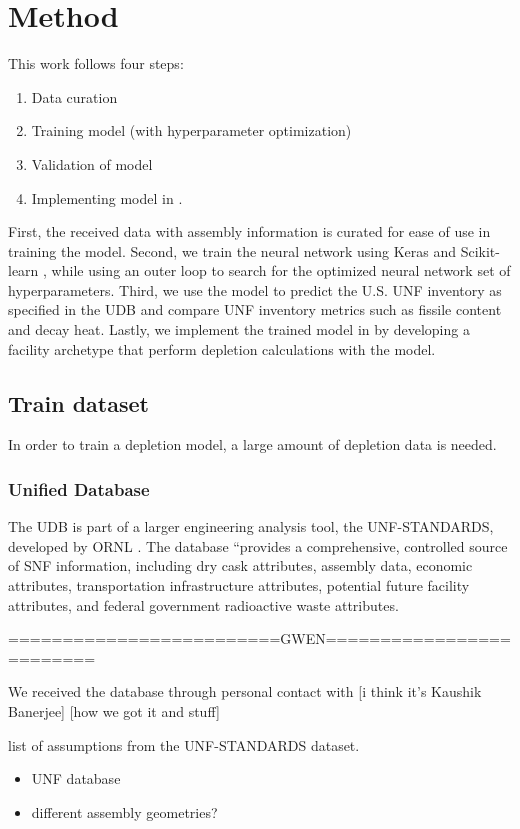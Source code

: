 \section{Method}

This work follows four steps:
\begin{enumerate}
\item Data curation
\item Training model (with hyperparameter optimization)
\item Validation of model
\item Implementing model in \Cyclus.
\end{enumerate}
First, the
received data with assembly information is
curated for ease of use in training the model.
Second, we train the neural network using Keras \cite{collet_keras_2015}
and Scikit-learn \cite{pedregosa_scikit-learn_2011},
while using an outer loop to
search for the optimized neural network set of hyperparameters.
Third, we use the model to predict the U.S. \gls{UNF}
inventory as specified in the \gls{UDB} and compare
\gls{UNF} inventory metrics such as fissile content
and decay heat. Lastly, we implement the trained
model in \Cyclus by developing a facility archetype
that perform depletion calculations with the model.

\subsection{Train dataset}

In order to train a depletion model, a large amount of
depletion data is needed.

\subsubsection{Unified Database}
The \gls{UDB} is part of a larger engineering
analysis tool, the \gls{UNF-STANDARDS}, developed
by \gls{ORNL} \cite{peterson_used_2013}. The
database ``provides a comprehensive, controlled
source of \gls{SNF} information, including
dry cask attributes, assembly data, economic attributes,
transportation infrastructure attributes, potential future
facility attributes, and federal government radioactive
waste attributes.

=========================GWEN=========================

We received the database through personal contact
with [i think it's Kaushik Banerjee] [how we got it and stuff]

list of assumptions from the \gls{UNF-STANDARDS} dataset.
\begin{itemize}
    \item UNF database
    \item different assembly geometries?
\end{itemize}

